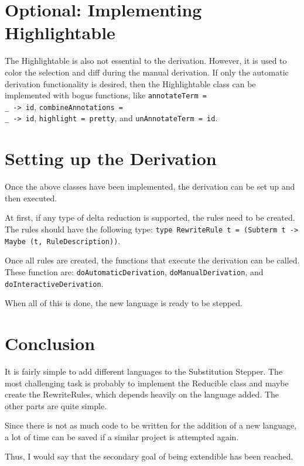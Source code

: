 \section{Optional: Implementing Highlightable}
The Highlightable is also not essential to the derivation.
However, it is used to color the selection and diff during the manual derivation.
If only the automatic derivation functionality is desired,
then the Highlightable class can be implemented with bogus functions,
like \texttt{annotateTerm = \\\_ -> id}, \texttt{combineAnnotations = \\\_ -> id},
\texttt{highlight = pretty}, and \texttt{unAnnotateTerm = id}.

\section{Setting up the Derivation}
Once the above classes have been implemented,
the derivation can be set up and then executed.

At first, if any type of delta reduction is supported,
the rules need to be created.
The rules should have the following type: \texttt{type RewriteRule t = (Subterm t -> Maybe (t, RuleDescription))}.

Once all rules are created,
the functions that execute the derivation can be called.
These function are: \texttt{doAutomaticDerivation},
\texttt{doManualDerivation},
and \texttt{doInteractiveDerivation}.

When all of this is done,
the new language is ready to be stepped.

\section{Conclusion}
It is fairly simple to add different languages to the Substitution Stepper.
The most challenging task is probably to implement the Reducible class and maybe create the RewriteRules, which depends heavily on the language added.
The other parts are quite simple.

Since there is not as much code to be written for the addition of a new language,
a lot of time can be saved if a similar project is attempted again.

Thus, I would say that the secondary goal of being extendible has been reached.
